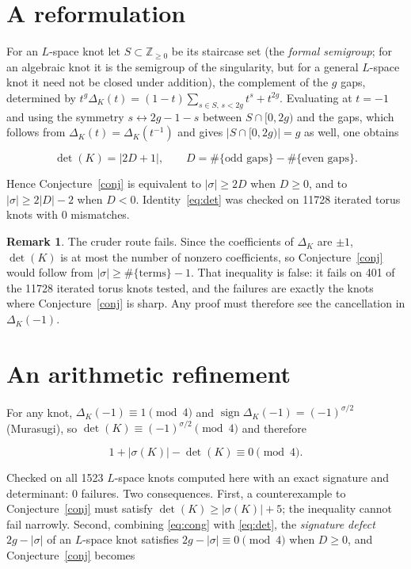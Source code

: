 \documentclass[11pt]{article}
\theoremstyle{definition}
\newtheorem{remark}{Remark}
\begin{document}
\section{A reformulation}

For an $L$-space knot let $S \subset \mathbb{Z}_{\ge 0}$ be its staircase set (the \emph{formal semigroup}; for an
algebraic knot it is the semigroup of the singularity, but for a general $L$-space knot it need not be closed under
addition), the complement of the $g$ gaps, determined by $t^{g}\Delta_K(t) = (1-t)\sum_{s \in S,\, s < 2g} t^{s} + t^{2g}$. Evaluating at $t = -1$ and using the symmetry
$s \leftrightarrow 2g-1-s$ between $S \cap [0,2g)$ and the gaps, which follows from $\Delta_K(t) = \Delta_K(t^{-1})$
and gives $|S \cap [0,2g)| = g$ as well, one obtains

\begin{equation}\label{eq:det}
 \det(K) = |2D+1|, \qquad D = \#\{\text{odd gaps}\} - \#\{\text{even gaps}\}.
\end{equation}

Hence Conjecture~\ref{conj} is equivalent to $|\sigma| \ge 2D$ when $D \ge 0$, and to $|\sigma| \ge 2|D| - 2$ when
$D < 0$. Identity~\eqref{eq:det} was checked on 11728 iterated torus knots with 0 mismatches.

\begin{remark}
The cruder route fails. Since the coefficients of $\Delta_K$ are $\pm 1$, $\det(K)$ is at most the number of nonzero
coefficients, so Conjecture~\ref{conj} would follow from $|\sigma| \ge \#\{\text{terms}\} - 1$. That inequality is false:
it fails on 401 of the 11728 iterated torus knots tested, and the failures are exactly the knots where
Conjecture~\ref{conj} is sharp. Any proof must therefore see the cancellation in $\Delta_K(-1)$.
\end{remark}

\section{An arithmetic refinement}

For any knot, $\Delta_K(-1) \equiv 1 \pmod 4$ and $\operatorname{sign}\Delta_K(-1) = (-1)^{\sigma/2}$ (Murasugi),
so $\det(K) \equiv (-1)^{\sigma/2} \pmod 4$ and therefore

\begin{equation}\label{eq:cong}
 1 + |\sigma(K)| - \det(K) \equiv 0 \pmod 4 .
\end{equation}

Checked on all 1523 $L$-space knots computed here with an exact signature and determinant: 0 failures. Two consequences. First, a counterexample to Conjecture~\ref{conj} must satisfy
$\det(K) \ge |\sigma(K)| + 5$; the inequality cannot fail narrowly. Second, combining \eqref{eq:cong} with
\eqref{eq:det}, the \emph{signature defect} $2g - |\sigma|$ of an $L$-space knot satisfies
$2g - |\sigma| \equiv 0 \pmod 4$ when $D \ge 0$, and Conjecture~\ref{conj} becomes
\end{document}
